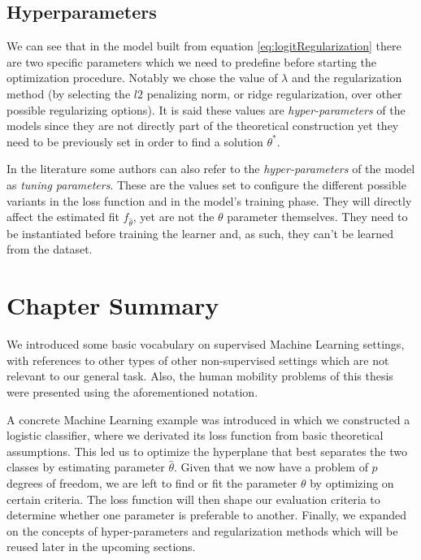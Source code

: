 \subsection{Hyperparameters}

We can see that in the model built from equation \cref{eq:logitRegularization} there are two specific parameters which we need to predefine before starting the optimization procedure.
Notably we chose the value of $\lambda$ and the regularization method (by selecting the $l2$ penalizing norm, or ridge regularization, over other possible regularizing options).
It is said these values are \textit{hyper-parameters} of the models since they are not directly part of the theoretical construction yet they need to be previously set in order to find a solution $\theta^\ast$.

In the literature some authors can also refer to the \textit{hyper-parameters} of the model as \textit{tuning parameters}.
These are the values set to configure the different possible variants in the loss function and in the model's training phase.
They will directly affect the estimated fit $f_{\hat{\theta}}$, yet are not the $\theta$ parameter themselves.
They need to be instantiated before training the learner and, as such, they can't be learned from the dataset.




\section{Chapter Summary}\label{section-ch_machine_learning_summary}

We introduced some basic vocabulary on supervised Machine Learning settings, with references to other types of other non-supervised settings which are not relevant to our general task.
Also, the human mobility problems of this thesis were presented using the aforementioned notation.

A concrete Machine Learning example was introduced in which we constructed a logistic classifier, where we derivated its loss function from basic theoretical assumptions.
This led us to optimize the hyperplane that best separates the two classes by estimating parameter $\hat{\theta}$.
Given that we now have a problem of $p$ degrees of freedom, we are left to find or fit the parameter $\theta$ by optimizing on certain criteria.
The loss function will then shape our evaluation criteria to determine whether one parameter is preferable to another.
Finally, we expanded on the concepts of hyper-parameters and regularization methods which will be reused later in the upcoming sections.


